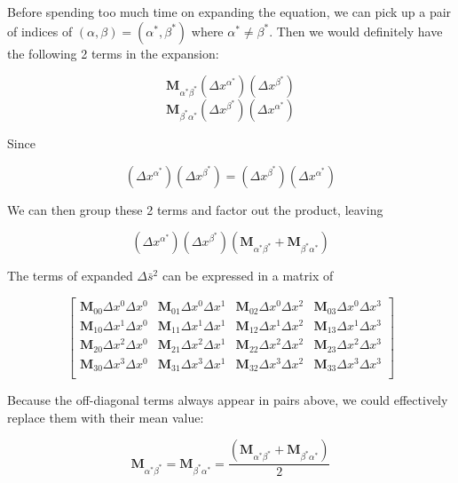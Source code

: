 Before spending too much time on expanding the equation, we can pick up a pair of indices of
$(\alpha, \beta) = (\alpha^*, \beta^*)$ where $\alpha^* \ne \beta^*$. Then we would definitely have the following 2
terms in the expansion:

\[ \boldsymbol{M}_{\alpha^*\beta^*}\left(\Delta x^{\alpha^*}\right)\left(\Delta x^{\beta^*}\right) \]
\[ \boldsymbol{M}_{\beta^*\alpha^*}\left(\Delta x^{\beta^*}\right)\left(\Delta x^{\alpha^*}\right) \]

Since

\[ \left(\Delta x^{\alpha^*}\right)\left(\Delta x^{\beta^*}\right) = \left(\Delta x^{\beta^*}\right)\left(\Delta x^{\alpha^*}\right) \]

We can then group these 2 terms and factor out the product, leaving

\[
    \left(\Delta x^{\alpha^*}\right)\left(\Delta x^{\beta^*}\right)\left( \boldsymbol{M}_{\alpha^*\beta^*} + \boldsymbol{M}_{\beta^*\alpha^*} \right)
\]

The terms of expanded $\Delta\bar{s}^2$ can be expressed in a matrix of

\[
    \renewcommand{\arraystretch}{4}
    \begin{bmatrix}
        \boldsymbol{M}_{00}\Delta x^0\Delta x^0 & \boldsymbol{M}_{01}\Delta x^0\Delta x^1 & \boldsymbol{M}_{02}\Delta x^0\Delta x^2  & \boldsymbol{M}_{03}\Delta x^0\Delta x^3 \\
        \boldsymbol{M}_{10}\Delta x^1\Delta x^0 & \boldsymbol{M}_{11}\Delta x^1\Delta x^1 & \boldsymbol{M}_{12}\Delta x^1\Delta x^2  & \boldsymbol{M}_{13}\Delta x^1\Delta x^3 \\
        \boldsymbol{M}_{20}\Delta x^2\Delta x^0 & \boldsymbol{M}_{21}\Delta x^2\Delta x^1 & \boldsymbol{M}_{22}\Delta x^2\Delta x^2  & \boldsymbol{M}_{23}\Delta x^2\Delta x^3 \\
        \boldsymbol{M}_{30}\Delta x^3\Delta x^0 & \boldsymbol{M}_{31}\Delta x^3\Delta x^1 & \boldsymbol{M}_{32}\Delta x^3\Delta x^2  & \boldsymbol{M}_{33}\Delta x^3\Delta x^3 \\
    \end{bmatrix}
\]

Because the off-diagonal terms always appear in pairs above, we could effectively replace them with their mean value:

\[
    \boldsymbol{M}_{\alpha^*\beta^*} = \boldsymbol{M}_{\beta^*\alpha^*} = \frac{\left( \boldsymbol{M}_{\alpha^*\beta^*} + \boldsymbol{M}_{\beta^*\alpha^*}\right)}{2}
\]

